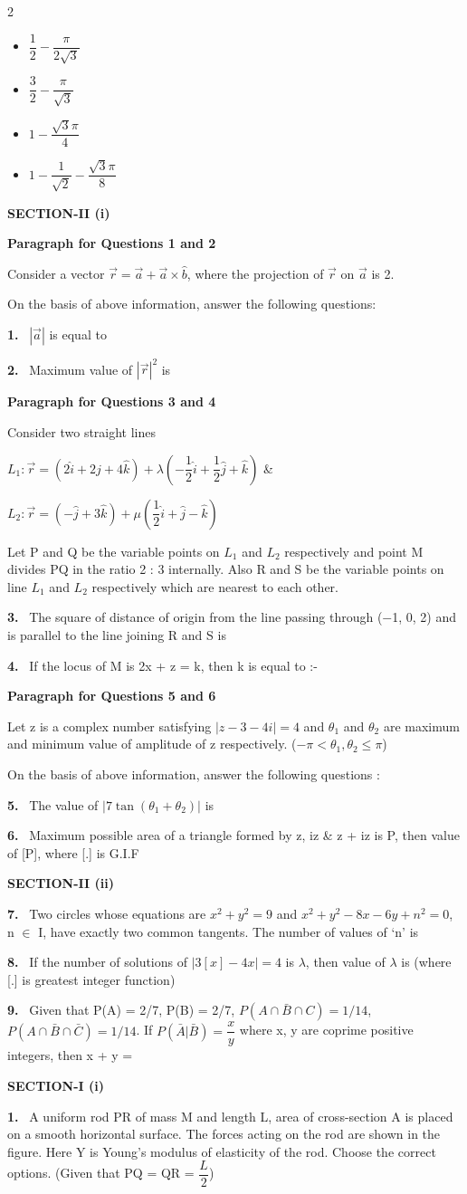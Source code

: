 \documentclass[10pt]{extarticle}
\newcommand{\papersec}[1]{\par\bigskip{\centering\Large\bfseries PAPER-#1\par}\medskip}
\newcommand{\partsec}[2]{\par\medskip\noindent{\large\bfseries PART-#1: #2}\par\smallskip}
\newcommand{\sect}[1]{\par\smallskip\noindent\textbf{#1}\par}
\newcommand{\qn}[1]{\par\smallskip\noindent\textbf{#1.}~}
\newcommand{\paraq}[2]{\par\smallskip\noindent\textbf{Paragraph for Questions #1 and #2}\par}
\newenvironment{qoptions}{\begin{itemize}[leftmargin=1.8em,itemsep=1pt,topsep=2pt,label={}]}{\end{itemize}}
\newcommand{\opt}[2]{\item[(#1)] #2}
\begin{document}
\begin{multicols}{2}
\begin{qoptions}
\opt{A}{$\dfrac12-\dfrac{\pi}{2\sqrt3}$}
\opt{B}{$\dfrac32-\dfrac{\pi}{\sqrt3}$}
\opt{C}{$1-\dfrac{\sqrt3\pi}{4}$}
\opt{D}{$1-\dfrac1{\sqrt2}-\dfrac{\sqrt3\pi}{8}$}
\end{qoptions}
\sect{SECTION-II (i)}
\paraq{1}{2}
Consider a vector $\vec r=\vec a+\vec a\times\hat b$, where the projection of $\vec r$ on $\vec a$ is 2.\par
On the basis of above information, answer the following questions:
\qn{1} $|\vec a|$ is equal to
\qn{2} Maximum value of $|\vec r|^2$ is
\paraq{3}{4}
Consider two straight lines\par
$L_1:\vec r=\left(2\hat i+2\hat j+4\hat k\right)+\lambda\left(-\dfrac12\hat i+\dfrac12\hat j+\hat k\right)$ \&\par
$L_2:\vec r=\left(-\hat j+3\hat k\right)+\mu\left(\dfrac12\hat i+\hat j-\hat k\right)$\par
Let P and Q be the variable points on $L_1$ and $L_2$ respectively and point M divides PQ in the ratio 2 : 3 internally. Also R and S be the variable points on line $L_1$ and $L_2$ respectively which are nearest to each other.
\qn{3} The square of distance of origin from the line passing through ($-$1, 0, 2) and is parallel to the line joining R and S is
\qn{4} If the locus of M is 2x + z = k, then k is equal to :-
\paraq{5}{6}
Let z is a complex number satisfying $|z-3-4i|=4$ and $\theta_1$ and $\theta_2$ are maximum and minimum value of amplitude of z respectively. ($-\pi<\theta_1,\theta_2\leq\pi$)\par
On the basis of above information, answer the following questions :
\qn{5} The value of $|7\tan(\theta_1+\theta_2)|$ is
\qn{6} Maximum possible area of a triangle formed by z, iz \& z + iz is P, then value of [P], where [.] is G.I.F
\sect{SECTION-II (ii)}
\qn{7} Two circles whose equations are $x^2+y^2=9$ and $x^2+y^2-8x-6y+n^2=0$, n $\in$ I, have exactly two common tangents. The number of values of `n' is
\qn{8} If the number of solutions of $|3[x]-4x|=4$ is $\lambda$, then value of $\lambda$ is (where [.] is greatest integer function)
\qn{9} Given that P(A) = 2/7, P(B) = 2/7, $P\left(A\cap\bar B\cap C\right)=1/14$, $P\left(A\cap\bar B\cap\bar C\right)=1/14$. If $P\left(\bar A|\bar B\right)=\dfrac xy$ where x, y are coprime positive integers, then x + y =
\raggedcolumns
\papersec{2}
\partsec{1}{PHYSICS}
\sect{SECTION-I (i)}
\qn{1} A uniform rod PR of mass M and length L, area of cross-section A is placed on a smooth horizontal surface. The forces acting on the rod are shown in the figure. Here Y is Young's modulus of elasticity of the rod. Choose the correct options. (Given that PQ = QR = $\dfrac L2$)\par

\end{multicols}
\end{document}
